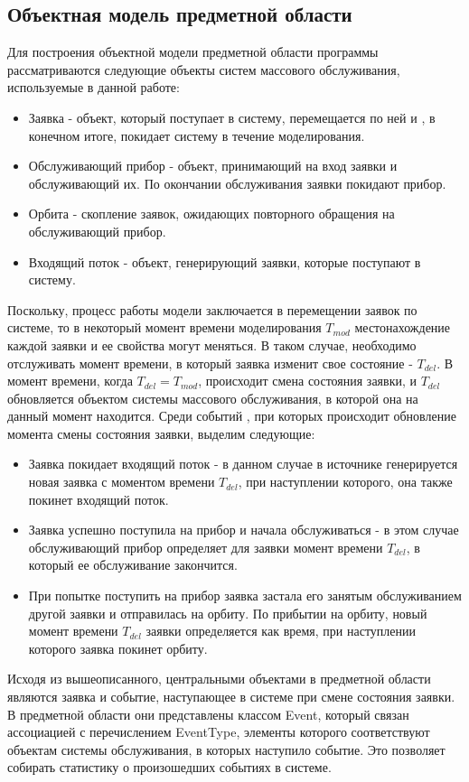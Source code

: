 \subsection {Объектная модель предметной области}
Для построения объектной модели предметной области программы рассматриваются следующие объекты систем массового обслуживания, используемые в данной работе:
\begin{itemize}
\item Заявка - объект, который поступает в систему, перемещается по ней и , в конечном итоге, покидает систему в течение моделирования.
\item Обслуживающий прибор - объект, принимающий на вход заявки и обслуживающий их. По окончании обслуживания заявки покидают прибор.
\item Орбита - скопление заявок, ожидающих повторного обращения на обслуживающий прибор.
\item Входящий поток - объект, генерирующий заявки, которые поступают в систему.
	\end{itemize}
 Поскольку, процесс работы модели заключается в перемещении заявок по системе, то в некоторый момент времени моделирования $T_{mod}$ местонахождение каждой заявки и ее свойства могут меняться. В таком случае, необходимо отслуживать момент времени, в который заявка изменит свое состояние - $T_{del}$. В момент времени, когда $T_{del} = T_{mod}$,  происходит смена состояния заявки, и  $T_{del}$ обновляется объектом системы массового обслуживания, в которой она на данный момент находится. Среди событий , при которых происходит обновление момента смены состояния заявки, выделим следующие:
\begin{itemize}
	\item Заявка покидает входящий поток - в данном случае в источнике генерируется новая заявка с моментом времени $T_{del}$, при наступлении которого, она также покинет входящий поток.
	\item Заявка успешно поступила на прибор и начала обслуживаться - в этом случае обслуживающий прибор определяет для заявки момент времени $T_{del}$, в который ее обслуживание закончится.
	\item При попытке поступить на прибор заявка застала его занятым обслуживанием другой заявки и отправилась на орбиту. По прибытии на орбиту, новый момент времени $T_{del}$ заявки определяется как время, при наступлении которого заявка покинет орбиту.
\end{itemize}
Исходя из вышеописанного, центральными объектами в предметной области являются заявка и событие, наступающее в системе при смене состояния заявки. В предметной области они представлены классом Event, который связан ассоциацией с перечислением EventType, элементы которого соответствуют объектам системы обслуживания, в которых наступило  событие. Это позволяет собирать статистику о произошедших событиях в системе.
